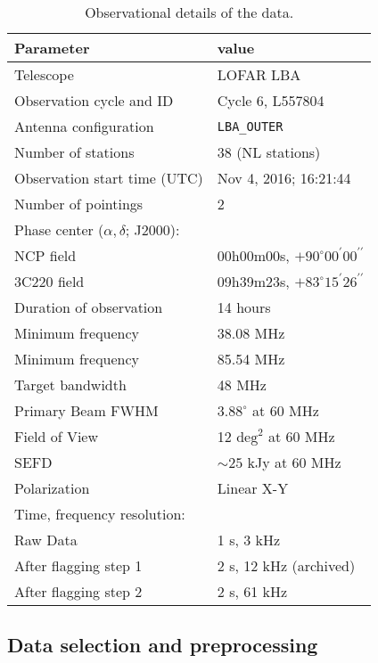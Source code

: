 \documentclass[fleqn,usenatbib]{mnras}
\begin{document}
\begin{table}
	\centering
	\caption{Observational details of the data.}
	\label{tab:obs_details}
	\begin{tabular}{ll} %
		\hline		
		\textbf{Parameter} & \textbf{value} \\	
		\hline
		Telescope & LOFAR LBA \\
		Observation cycle and ID & Cycle 6, L557804\\ 		
		Antenna configuration & \texttt{LBA\_OUTER} \\
		Number of stations & 38 (NL stations) \\
		Observation start time (UTC) & Nov 4, 2016; 16:21:44 \\
        Number of pointings & 2 \\
		Phase center ($\alpha,\delta$; J2000): & \\
        \quad NCP field & 00h00m00s, $+90^{\circ}00^{\prime}00^{\prime\prime}$ \\
        \quad 3C220 field & 09h39m23s, $+83^{\circ}15^{\prime}26^{\prime\prime}$\\
		Duration of observation & 14 hours   \\
        Minimum frequency & 38.08 MHz \\
        Minimum frequency & 85.54 MHz \\
		Target bandwidth & 48 MHz \\
		Primary Beam FWHM & $3.88^{\circ}$ at 60 MHz \\
		Field of View & 12 $\text{deg}^2$ at 60 MHz\\
		SEFD  & $\sim25$ kJy at 60 MHz\\		
		Polarization & Linear X-Y   \\
		Time, frequency resolution: \\
		\quad Raw Data & 1 s, 3 kHz      \\
		\quad After flagging step 1 & 2 s, 12 kHz (archived)\\
        \quad After flagging step 2	& 2 s, 61 kHz \\
		\hline
	\end{tabular}
\end{table}


\subsection{Data selection and preprocessing}\label{subsec:preprocessing}
\end{document}
